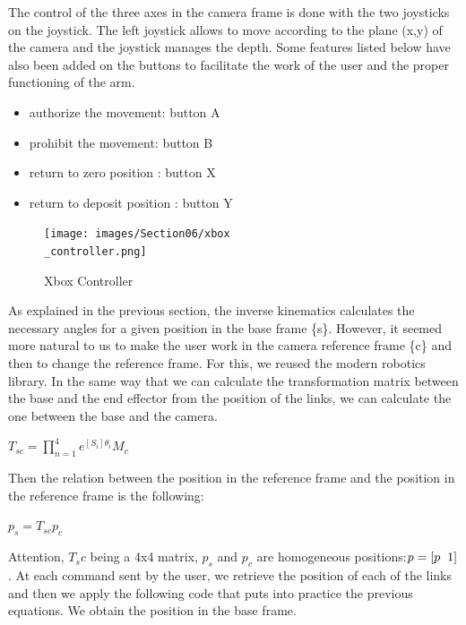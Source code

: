 \bigbreak
The control of the three axes in the camera frame is done with the two joysticks on the joystick. The left joystick allows to move according to the plane (x,y) of the camera and the joystick manages the depth. Some features listed below have also been added on the buttons to facilitate the work of the user and the proper functioning of the arm.
\begin{itemize}[noitemsep]
    \item authorize the movement: button A
    \item prohibit the movement: button B
    \item return to zero position : button X
    \item return to deposit position : button Y
\end{itemize}

\begin{figure}[ht]
    \centering
    \texttt{[image: images/Section06/xbox\\\_controller.png]}
    \caption{Xbox Controller}
    \label{fig:mesh18}
\end{figure}
\FloatBarrier

\bigbreak
As explained in the previous section, the inverse kinematics calculates the necessary angles for a given position in the base frame \{s\}. However, it seemed more natural to us to make the user work in the camera reference frame \{c\} and then to change the reference frame. For this, we reused the modern robotics library. In the same way that we can calculate the transformation matrix between the base and the end effector from the position of the links, we can calculate the one between the base and the camera. 
\begin{center}
    $T_{sc} =\displaystyle \prod_{n=1}^4e^{[S_i]\theta_i}M_c$
\end{center}

\bigbreak
Then the relation between the position in the reference frame and the position in the reference frame is the following:
\begin{center}
    $p_s = T_{sc}p_c$
\end{center}

\bigbreak
Attention, $T_sc$ being a 4x4 matrix, $p_s$ and $p_c$ are homogeneous positions:$p = [p\hspace{0.2cm}1]$. At each command sent by the user, we retrieve the position of each of the links and then we apply the following code that puts into practice the previous equations. We obtain the position in the base frame.

